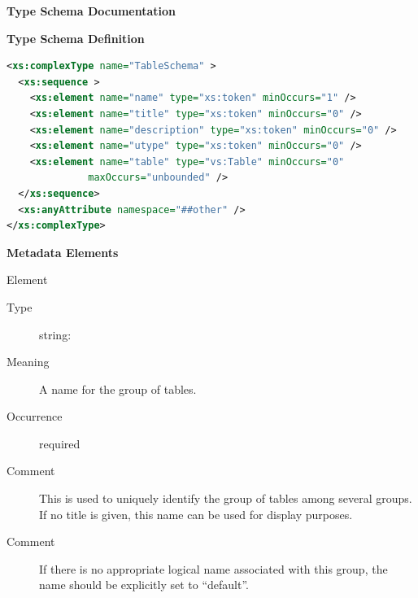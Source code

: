 \documentclass[11pt,a4paper]{ivoa}
\begin{document}
\begin{generated}
\begingroup
      	\renewcommand*\descriptionlabel[1]{%
      	\hbox to 5.5em{\emph{#1}\hfil}}\vspace{2ex}\noindent\textbf{ Type Schema Documentation}


\vspace{1ex}\noindent\textbf{ Type Schema Definition}

\begin{lstlisting}[language=XML,basicstyle=\footnotesize]
<xs:complexType name="TableSchema" >
  <xs:sequence >
    <xs:element name="name" type="xs:token" minOccurs="1" />
    <xs:element name="title" type="xs:token" minOccurs="0" />
    <xs:element name="description" type="xs:token" minOccurs="0" />
    <xs:element name="utype" type="xs:token" minOccurs="0" />
    <xs:element name="table" type="vs:Table" minOccurs="0"
              maxOccurs="unbounded" />
  </xs:sequence>
  <xs:anyAttribute namespace="##other" />
</xs:complexType>
\end{lstlisting}

\vspace{0.5ex}\noindent\textbf{ Metadata Elements}

\begingroup\small\begin{bigdescription}\item[Element \xmlel{name}]
\begin{description}
\item[Type] string: 
\item[Meaning] 
               A name for the group of tables.  
             
\item[Occurrence] required
\item[Comment] 
               This is used to uniquely identify the group of tables among
               several groups.  If no title is given, this
               name can be used for display purposes.
             
\item[Comment] 
               If there is no appropriate logical name associated with
               this group, the name should be explicitly set to
               “default”.  
             


\end{description}
\end{bigdescription}
\end{generated}
\end{document}

